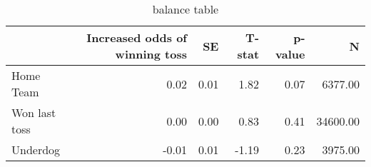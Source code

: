 \begin{table}[ht]
\centering
\begin{tabular}{lrrrrr}
  \hline
 & Increased odds of winning toss & SE & T-stat & p-value & N \\ 
  \hline
Home Team & 0.02 & 0.01 & 1.82 & 0.07 & 6377.00 \\ 
  Won last toss & 0.00 & 0.00 & 0.83 & 0.41 & 34600.00 \\ 
  Underdog & -0.01 & 0.01 & -1.19 & 0.23 & 3975.00 \\ 
   \hline
\end{tabular}
\caption{balance table} 
\label{table:baltab}
\end{table}
